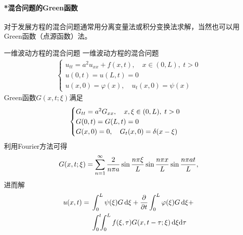 \paragraph*{*混合问题的Green函数}对于发展方程的混合问题通常用分离变量法或积分变换法求解，当然也可以用Green函数（点源函数）法。
\begin{example}{一维波动方程的混合问题}{}
	一维波动方程的混合问题
	\begin{align*}
		\begin{cases}
			u_{tt}=a^2u_{xx}+f(x,t),\quad x\in(0,L),\;t>0\\
			u(0,t)=u(L,t)=0\\
			u(x,0)=\varphi(x),\quad u_t(x,0)=\psi(x)
		\end{cases}
	\end{align*}
	Green函数$G(x,t;\xi)$满足 
	\begin{align*}
		\begin{cases}
			G_{tt}=a^2G_{xx},\quad x,\xi\in(0,L),\;t>0\\
			G(0,t)=G(L,t)=0\\
			G(x,0)=0,\quad G_t(x,0)=\mathop{}\!\delta(x-\xi)
		\end{cases}
	\end{align*}
	利用Fourier方法可得
	\[
		G(x,t;\xi)=\sum_{n=1}^{\infty}\frac2{n\pi a}\sin\frac{n\pi\xi}L\sin\frac{n\pi x}L\sin\frac{n\pi at}L,
	\]
	进而解
	\begin{align}
		\begin{aligned}
			u(x,t)={}&\int_0^L\psi(\xi)G\d\xi+\pp t\int_0^L\varphi(\xi)G\d\xi+\\
			&\int_0^t\bs4\int_0^L f(\xi,\tau)G(x,t-\tau;\xi)\d\xi\nd\tau
		\end{aligned}
	\end{align}
\end{example}


